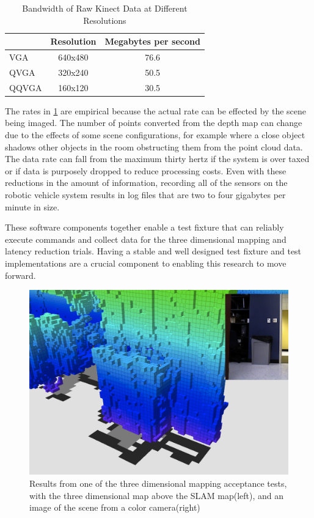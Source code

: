\documentclass[12pt]{report}
\begin{document}
\begin{table}[h]
\caption{Bandwidth of Raw Kinect Data at Different Resolutions}
\label{tab:kinect_data}
\begin{center}
  \begin{tabular}{ | l | c | c | }
    \hline
    ~ & Resolution & Megabytes per second \\
    \hline
    VGA & 640x480 & 76.6 \\
    QVGA & 320x240 & 50.5 \\
    QQVGA & 160x120 & 30.5 \\
    \hline
  \end{tabular}
\end{center}
\end{table}

The rates in \ref{tab:kinect_data} are empirical because the actual rate can be effected by the scene being imaged.  The number of points converted from the depth map can change due to the effects of some scene configurations, for example where a close object shadows other objects in the room obstructing them from the point cloud data.  The data rate can fall from the maximum thirty hertz if the system is over taxed or if data is purposely dropped to reduce processing costs.  Even with these reductions in the amount of information, recording all of the sensors on the robotic vehicle system results in log files that are two to four gigabytes per minute in size.

These software components together enable a test fixture that can reliably execute commands and collect data for the three dimensional mapping and latency reduction trials.  Having a stable and well designed test fixture and test implementations are a crucial component to enabling this research to move forward.

\begin{figure}[ht]
  \centering
  \includegraphics[width=6.5in,keepaspectratio]{mapping_trashcan.png}
  \caption{Results from one of the three dimensional mapping acceptance tests, with the three dimensional map above the SLAM map(left), and an image of the scene from a color camera(right)}
  \label{fig:mapping_trashcan}
\end{figure}
\end{document}
